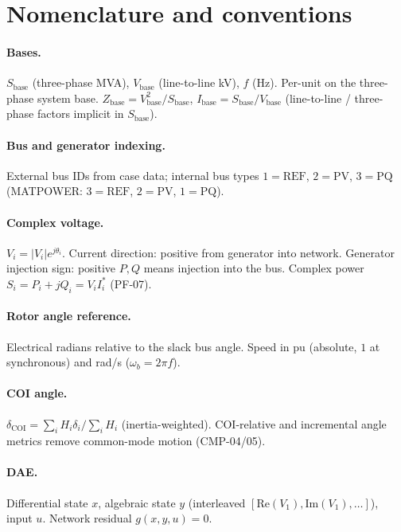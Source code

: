 \documentclass[12pt,a4paper]{article}
\begin{document}
\section{Nomenclature and conventions}

\paragraph{Bases.} $S_{\mathrm{base}}$ (three-phase MVA), $V_{\mathrm{base}}$
(line-to-line kV), $f$ (Hz). Per-unit on the three-phase system base.
$Z_{\mathrm{base}}=V_{\mathrm{base}}^2/S_{\mathrm{base}}$,
$I_{\mathrm{base}}=S_{\mathrm{base}}/V_{\mathrm{base}}$ (line-to-line /
three-phase factors implicit in $S_{\mathrm{base}}$).

\paragraph{Bus and generator indexing.} External bus IDs from case data;
internal bus types $1{=}\text{REF}$, $2{=}\text{PV}$, $3{=}\text{PQ}$ (MATPOWER:
$3{=}\text{REF}$, $2{=}\text{PV}$, $1{=}\text{PQ}$).

\paragraph{Complex voltage.} $V_i=|V_i|e^{j\theta_i}$. Current direction:
positive from generator into network. Generator injection sign: positive
$P,Q$ means injection into the bus. Complex power $S_i=P_i+jQ_i=V_i I_i^*$
(PF-07).

\paragraph{Rotor angle reference.} Electrical radians relative to the slack
bus angle. Speed in pu (absolute, $1$ at synchronous) and rad/s
($\omega_b=2\pi f$).

\paragraph{COI angle.} $\delta_{\mathrm{COI}}=\sum_i H_i\delta_i/\sum_i H_i$
(inertia-weighted). COI-relative and incremental angle metrics remove
common-mode motion (CMP-04/05).

\paragraph{DAE.} Differential state $x$, algebraic state $y$ (interleaved
$[\mathrm{Re}(V_1),\mathrm{Im}(V_1),\ldots]$), input $u$. Network residual
$g(x,y,u)=0$.
\end{document}
